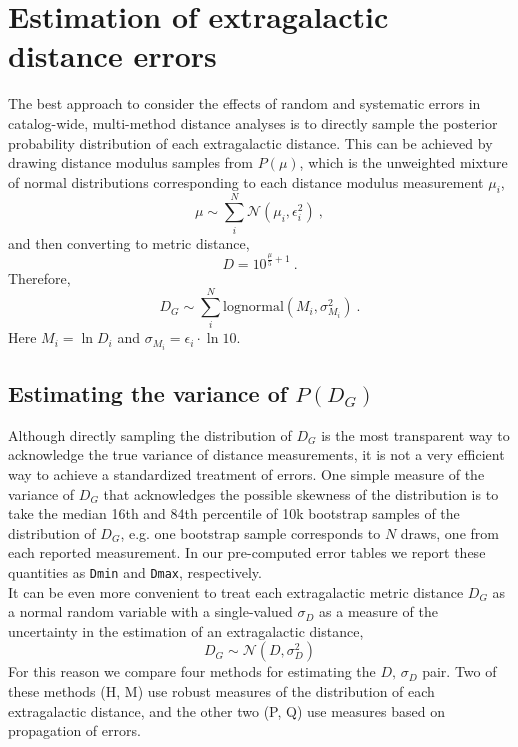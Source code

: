 \documentclass[a4paper,fleqn,usenatbib]{mnras}
\begin{document}
\section{Estimation of extragalactic distance errors}
\label{sec:post} 
 
The best approach to consider the effects of random and systematic errors in catalog-wide, multi-method distance analyses is to directly sample the posterior probability distribution of each extragalactic distance. This can be achieved by drawing distance modulus samples from $P(\mu)$, which is the unweighted mixture of normal distributions corresponding to each distance modulus measurement $\mu_i$,
\[\mu\sim\sum_i^N \mathcal{N}(\mu_i,\epsilon_i^2)\ ,\]
and then converting to metric distance,
\[D=10^{\frac{\mu}{5}+1}\ .\]
Therefore,
\begin{equation}\label{eqn:mix}
D_G\sim\sum_i^N\mathrm{lognormal}(M_i,\sigma_{M_i}^2)\ .
\end{equation}
Here $M_i=\ln D_i$ and $\sigma_{M_i}=\epsilon_i\cdot\ln10$.

\subsection{Estimating the variance of $P(D_G)$}
\label{sec:meth} 

Although directly sampling the distribution of $D_G$ is the most transparent way to acknowledge the true variance of distance measurements, it is not a very efficient way to achieve a standardized treatment of errors. One simple measure of the variance of $D_G$ that acknowledges the possible skewness of the distribution is to take the median 16th and 84th percentile of 10k bootstrap samples of the distribution of $D_G$, e.g. one bootstrap sample corresponds to $N$ draws, one from each reported measurement. In our pre-computed error tables we report these quantities as \texttt{Dmin} and \texttt{Dmax}, respectively.\\

It can be even more convenient to treat each extragalactic metric distance $D_G$ as a normal random variable with a single-valued $\sigma_D$ as a measure of the uncertainty in the estimation of an extragalactic distance,
\begin{equation}\label{eqn:norm}
D_G\sim \mathcal{N}(D,\sigma_D^2)
\end{equation}
For this reason we compare four methods for estimating the $D,\,\sigma_D$ pair. Two of these methods (H, M) use robust measures of the distribution of each extragalactic distance, and the other two (P, Q) use measures based on propagation of errors.\\
\end{document}
